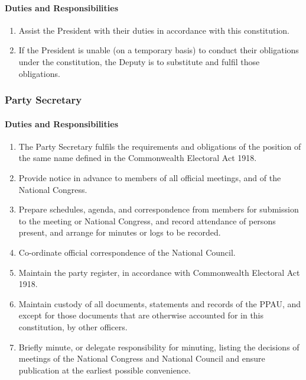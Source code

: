 \documentclass[a4paper,titlepage,8.5pt]{article}
\begin{document}
\paragraph{Duties and Responsibilities}

\begin{enumerate}
\item Assist the President with their duties in accordance with this constitution.
\item If the President is unable (on a temporary basis) to conduct their obligations under the constitution, the Deputy is to substitute and fulfil those obligations.
\end{enumerate}

\subsubsection{Party Secretary}

\paragraph{Duties and Responsibilities}

\begin{enumerate}
\item The Party Secretary fulfils the requirements and obligations of the position of the same name defined in the Commonwealth Electoral Act 1918.
\item Provide notice in advance to members of all official meetings, and of the National Congress.
\item Prepare schedules, agenda, and correspondence from members for submission to the meeting or National Congress, and record attendance of persons present, and arrange for minutes or logs to be recorded.
\item Co-ordinate official correspondence of the National Council.
\item Maintain the party register, in accordance with Commonwealth Electoral Act 1918.
\item Maintain custody of all documents, statements and records of the PPAU, and except for those documents that are otherwise accounted for in this constitution, by other officers.
\item Briefly minute, or delegate responsibility for minuting, listing the decisions of meetings of the National Congress and National Council and ensure publication at the earliest possible convenience.
\end{enumerate}
\end{document}
